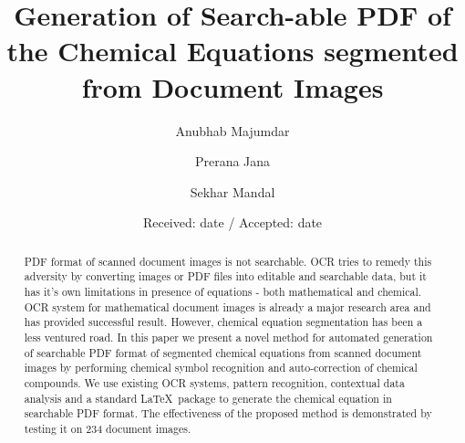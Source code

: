 \usepackage{float}
%
%
%
%
%


\title{Generation of Search-able PDF of the Chemical Equations segmented from Document Images}


\author{Anubhab Majumdar         \and
            Prerana Jana 				\and
            Sekhar Mandal
}



\date{Received: date / Accepted: date}


\maketitle

\begin{abstract}
 PDF format of scanned document images is not searchable. OCR tries to remedy this adversity by converting images or PDF files into
editable and searchable data, but it has it’s own limitations in presence of equations - both mathematical and chemical. OCR system for mathematical document images is already a major research area and has provided successful result. However,
chemical equation segmentation has been a less ventured road. In this paper we present a novel method for automated generation of searchable PDF format of segmented chemical equations from scanned document images by performing chemical symbol recognition and auto-correction of chemical compounds. We use existing OCR systems, pattern recognition, contextual data
analysis and a standard \LaTeX\ package to generate the chemical equation in searchable PDF format. The effectiveness of the
proposed method is demonstrated by testing it on 234 document images. 

\end{abstract}

